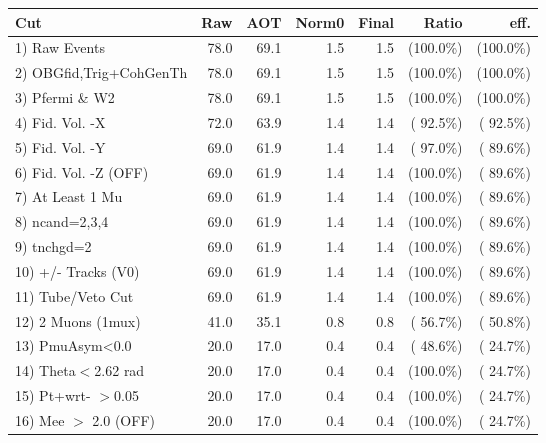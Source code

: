  \begin{table}[h!]\centering
 \begin{tabular}{||l||r|r|r|r|r|r||}
 \hline
 \hline
 Cut & Raw & AOT & Norm0 & Final & Ratio & eff.       \\
 \hline
  1) Raw Events           &         78.0 &         69.1 &          1.5 &          1.5 & (100.0\%) & (100.0\%) \\
  2) OBGfid,Trig+CohGenTh &         78.0 &         69.1 &          1.5 &          1.5 & (100.0\%) & (100.0\%) \\
  3) Pfermi \& W2         &         78.0 &         69.1 &          1.5 &          1.5 & (100.0\%) & (100.0\%) \\
  4) Fid. Vol. -X         &         72.0 &         63.9 &          1.4 &          1.4 & ( 92.5\%) & ( 92.5\%) \\
  5) Fid. Vol. -Y         &         69.0 &         61.9 &          1.4 &          1.4 & ( 97.0\%) & ( 89.6\%) \\
  6) Fid. Vol. -Z (OFF)   &         69.0 &         61.9 &          1.4 &          1.4 & (100.0\%) & ( 89.6\%) \\
  7) At Least 1 Mu        &         69.0 &         61.9 &          1.4 &          1.4 & (100.0\%) & ( 89.6\%) \\
  8) ncand=2,3,4          &         69.0 &         61.9 &          1.4 &          1.4 & (100.0\%) & ( 89.6\%) \\
  9) tnchgd=2             &         69.0 &         61.9 &          1.4 &          1.4 & (100.0\%) & ( 89.6\%) \\
 10) +/- Tracks (V0)      &         69.0 &         61.9 &          1.4 &          1.4 & (100.0\%) & ( 89.6\%) \\
 11) Tube/Veto Cut        &         69.0 &         61.9 &          1.4 &          1.4 & (100.0\%) & ( 89.6\%) \\
 12) 2 Muons (1mux)       &         41.0 &         35.1 &          0.8 &          0.8 & ( 56.7\%) & ( 50.8\%) \\
 13) PmuAsym<0.0          &         20.0 &         17.0 &          0.4 &          0.4 & ( 48.6\%) & ( 24.7\%) \\
 14) Theta$<$2.62 rad     &         20.0 &         17.0 &          0.4 &          0.4 & (100.0\%) & ( 24.7\%) \\
 15) Pt+wrt- $>$0.05      &         20.0 &         17.0 &          0.4 &          0.4 & (100.0\%) & ( 24.7\%) \\
 16) Mee $>$ 2.0  (OFF)   &         20.0 &         17.0 &          0.4 &          0.4 & (100.0\%) & ( 24.7\%) \\

\end{tabular}
\end{table}
